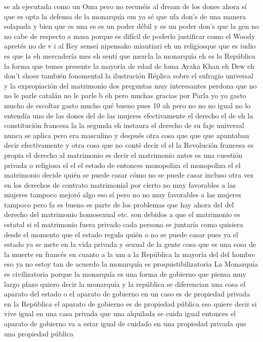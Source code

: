 se ah ejecutada como un Oma pero no recunéis al dream de los dones ahora sí que es opta la defensa de la monarquía em
ya sé que ufa don's de una manera solapada y bien que es una es es un poder débil y es un poder don's que la gen no
no cabe de respecto a masa porque es difícil de poderlo justificar como el Woody apretés no de v i al Rey sensei nipensako miautiari
eh un religiosque que es iudio es que la eh mercadería mes eh sentí que mezcla la monarquía eh es la República
la forma que temes presente la mayoría de edad de loma Ayaka Khan eh Dew
eh don't shoes también fonomental la ilustración
Réplica sobre el sufragio universal y la expropiación del matrimonio
dos preguntas muy interesantes perdona que no no le parle catalán no le parle b eh pero muchas gracias por Parla
yo yo gasto mucho de escoltar gasto mucho qué bueno pues 10 ah pero no no no igual no lo entendía
uno de las dones del de las mujeres efectivamente el derecho el de eh
la constitución francesa la la segunda eh instaura el derecho de su faje universal nunca se aplica pero era masculino
y después otra cosa que que que apuntaban decir efectivamente y otra cosa que no conté decir el
el la Revolución francesa es propia el derecho al matrimonio es decir el matrimonio antes es una cuestión privada o religiosa
el el el estado de entonces monopoliza el monopoliza el
el matrimonio decide quién se puede casar cómo no se puede casar incluso otra vez en los derechos de contrato matrimonial por cierto no muy favorables a las mujeres
tampoco mejoró algo eso sí pero no no muy favorables a las mujeres tampoco pero fa es bueno
es parte de los problemas que hay ahora del del derecho del matrimonio homosexual etc. son debidos a que el matrimonio es estatal
si el matrimonio fuera privado cada persona se juntaría como quisiera desde el momento que el estado regula quién o no se puede casar pues ya el estado
ya se mete en la vida privada y sexual de la gente cosa que es una cosa de la muerte en francés en cuanto a la um
a la República la mayoría del del hombre eso ya no estoy tan de acuerdo la monarquía es proquistibilizatoria
La Monarquía es civilizatoria
porque la monarquía es una forma de gobierno que piensa muy largo plazo quiero decir la monarquía y la república se diferencian
una cosa el aparato del estado o el aparato de gobierno en un caso es de propiedad privada en la República
el aparato de gobierno es de propiedad pública eso quiere decir
si vive igual en una casa privada que una alquilada se cuida igual
entonces el aparato de gobierno va a estar igual de cuidado en una propiedad privada que una propiedad pública
